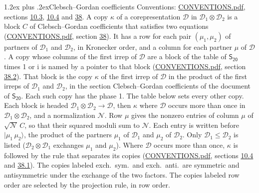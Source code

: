 \documentclass[10pt,a4paper]{article}
\makeatletter
\renewcommand\section{\@startsection{section}{1}{\z@}{-3ex plus -1ex minus -.2ex}%
  {1.2ex plus .2ex}{\normalfont\large\sffamily\bfseries\color{parttitle}}}
\numberwithin{equation}{section}
\newcommand{\grp}[1]{\mathsf{#1}}
\newcommand{\iunit}{\mathrm{i}}
\newcommand{\irrprod}{\otimes}
\newcommand{\mult}{\kappa}
\newcommand{\intx}{\mu}
\newcommand{\cgnorm}{\mathcal{N}}
\newcommand{\prodket}[2]{\lvert {#1}\,{#2}\rangle}
\makeatother
\begin{document}
\section{Clebsch--Gordan coefficients}\label{s:clebsch_gordan}
Conventions: \href{../../CONVENTIONS.pdf}{CONVENTIONS.pdf}, sections \href{../../../rotation/CONVENTIONS.pdf\#conv.10.3}{10.3}, \href{../../../rotation/CONVENTIONS.pdf\#conv.10.4}{10.4} and \href{../../CONVENTIONS.pdf\#conv.38}{38}.
\leavevmode\label{n:index.copy}\label{n:matrix.cg.stored}A copy $\mult$ of a corepresentation $\mathcal{D}$ in $\mathcal{D}_1\irrprod\mathcal{D}_2$ is a block $C$ of Clebsch--Gordan coefficients that satisfies two equations (\href{../../CONVENTIONS.pdf}{CONVENTIONS.pdf}, section \href{../../CONVENTIONS.pdf\#conv.38}{38}). \label{n:index.cg}It has a row for each pair $(\intx_1, \intx_2)$ of partners of $\mathcal{D}_1$ and $\mathcal{D}_2$, in Kronecker order, and a column for each partner $\intx$ of $\mathcal{D}$.
A copy whose columns of the first irrep of $\mathcal{D}$ are a block of the table of $\grp{S_{20}}$ times 1 or $\iunit$ is named by a pointer to that block (\href{../../CONVENTIONS.pdf}{CONVENTIONS.pdf}, section \href{../../CONVENTIONS.pdf\#conv.38.2}{38.2}). That block is the copy $\mult$ of the first irrep of $\mathcal{D}$ in the product of the first irreps of $\mathcal{D}_1$ and $\mathcal{D}_2$, in the section Clebsch--Gordan coefficients of the document of \href{../../../rotation/data/pdf/S20.pdf}{$\grp{S_{20}}$}. Each such copy has the phase 1. The table below sets every other copy.
Each block is headed $\mathcal{D}_1\irrprod\mathcal{D}_2\to\mathcal{D}$, then $\mult$ where $\mathcal{D}$ occurs more than once in $\mathcal{D}_1\irrprod\mathcal{D}_2$, and a normalization $\cgnorm$. Row $\intx$ gives the nonzero entries of column $\intx$ of $\sqrt{\cgnorm}\,C$, so that their squared moduli sum to $\cgnorm$. \label{n:vector.ket.product}Each entry is written before $\prodket{\intx_1}{\intx_2}$, the product of the partners $\intx_1$ of $\mathcal{D}_1$ and $\intx_2$ of $\mathcal{D}_2$. Only $\mathcal{D}_1 \le \mathcal{D}_2$ is listed ($\mathcal{D}_2\irrprod\mathcal{D}_1$ exchanges $\intx_1$ and $\intx_2$).
Where $\mathcal{D}$ occurs more than once, $\mult$ is followed by the rule that separates its copies (\href{../../CONVENTIONS.pdf}{CONVENTIONS.pdf}, sections \href{../../../rotation/CONVENTIONS.pdf\#conv.10.4}{10.4} and \href{../../CONVENTIONS.pdf\#conv.38.1}{38.1}). \label{n:abbreviation.exchange}The copies labeled exch.\ sym.\ and exch.\ anti.\ are symmetric and antisymmetric under the exchange of the two factors. The copies labeled row order are selected by the projection rule, in row order.
\end{document}
